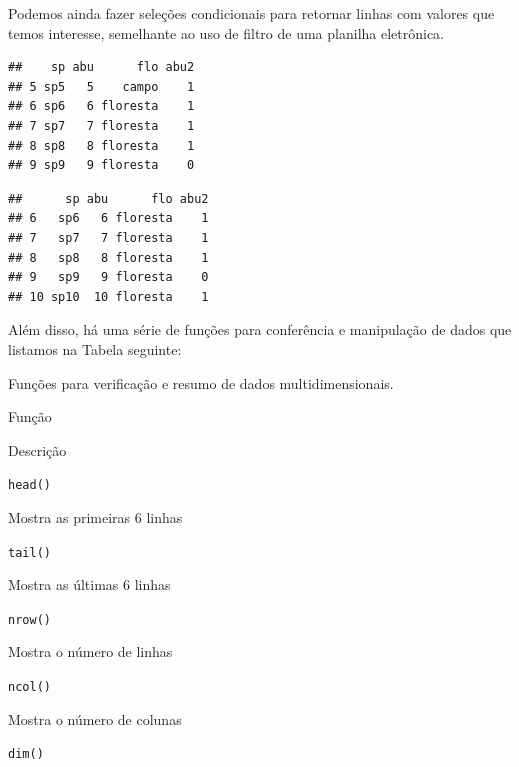 \documentclass[
]{article}
\newenvironment{Shaded}{\begin{snugshade}}{\end{snugshade}}
\newcommand{\DecValTok}[1]{\textcolor[rgb]{0.00,0.00,0.81}{#1}}
\newcommand{\DocumentationTok}[1]{\textcolor[rgb]{0.56,0.35,0.01}{\textbf{\textit{#1}}}}
\newcommand{\NormalTok}[1]{#1}
\newcommand{\SpecialCharTok}[1]{\textcolor[rgb]{0.81,0.36,0.00}{\textbf{#1}}}
\newcommand{\StringTok}[1]{\textcolor[rgb]{0.31,0.60,0.02}{#1}}
\begin{document}
Podemos ainda fazer seleções condicionais para retornar linhas com valores que temos interesse, semelhante ao uso de filtro de uma planilha eletrônica.

\begin{Shaded}
\end{Shaded}

\begin{verbatim}
##    sp abu      flo abu2
## 5 sp5   5    campo    1
## 6 sp6   6 floresta    1
## 7 sp7   7 floresta    1
## 8 sp8   8 floresta    1
## 9 sp9   9 floresta    0
\end{verbatim}

\begin{Shaded}
\end{Shaded}

\begin{verbatim}
##      sp abu      flo abu2
## 6   sp6   6 floresta    1
## 7   sp7   7 floresta    1
## 8   sp8   8 floresta    1
## 9   sp9   9 floresta    0
## 10 sp10  10 floresta    1
\end{verbatim}

Além disso, há uma série de funções para conferência e manipulação de dados que listamos na Tabela seguinte:

\label{tab:tab-funcoes-conf-multi}Funções para verificação e resumo de dados multidimensionais.

Função

Descrição

\texttt{head()}

Mostra as primeiras 6 linhas

\texttt{tail()}

Mostra as últimas 6 linhas

\texttt{nrow()}

Mostra o número de linhas

\texttt{ncol()}

Mostra o número de colunas

\texttt{dim()}
\end{document}
